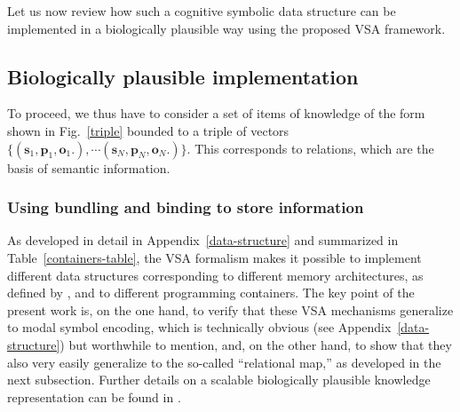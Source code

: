 \documentclass[sn-mathphys]{sn-jnl}
\begin{document}
Let us now review how such a cognitive symbolic data structure can be implemented in a biologically plausible way using the proposed VSA framework. 

\subsection{Biologically plausible implementation} \label{plausible-implementation}

To proceed, we thus have to consider a set of items of knowledge of the form shown in Fig.~\ref{triple} bounded to a triple of vectors $\{(\mathbf{s}_1,  \mathbf{p}_1,  \mathbf{o}_1.), \cdots (\mathbf{s}_N,  \mathbf{p}_N,  \mathbf{o}_N.)\}$. This corresponds to relations, which are the basis of semantic information.

\subsubsection{Using bundling and binding to store information} \label{containers}

As developed in detail in Appendix~\ref{data-structure} and summarized in Table~\ref{containers-table}, the VSA formalism makes it possible to implement different data structures corresponding to different memory architectures, as defined by \cite{eichenbaum_memory_2017}, and to different programming containers. The key point of the present work is, on the one hand, to verify that these VSA mechanisms generalize to modal symbol encoding, which is technically obvious (see Appendix~\ref{data-structure}) but worthwhile to mention, and, on the other hand, to show that they also very easily generalize to the so-called ``relational map,'' as developed in the next subsection. Further details on a scalable biologically plausible knowledge representation can be found in \cite{crawford_biologically_2016}.
\end{document}
